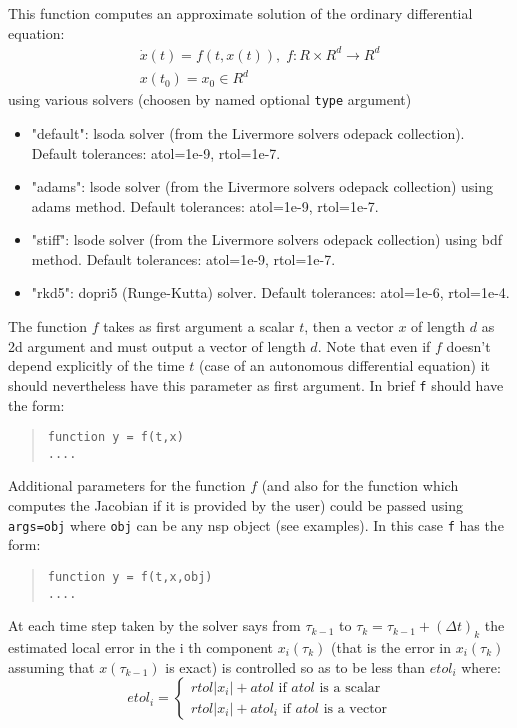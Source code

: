 \begin{mandescription}

This function computes an approximate solution of the ordinary differential equation:
$$
\begin{array}{l}
   \dot{x}(t) = f(t, x(t)), \; f: R \times R^d \rightarrow  R^d \\
   x(t_0) = x_0  \in  R^d
\end{array}
$$
using various solvers (choosen by named optional \verb+type+ argument) 
\begin{itemize}
\item "default": lsoda solver (from the Livermore solvers odepack collection). Default tolerances: atol=1e-9,
  rtol=1e-7.  
\item "adams": lsode solver (from the Livermore solvers odepack collection) using adams method. Default tolerances: atol=1e-9, rtol=1e-7.
\item "stiff": lsode solver (from the Livermore solvers odepack collection) using bdf method. Default tolerances: atol=1e-9, rtol=1e-7.
\item "rkd5": dopri5 (Runge-Kutta) solver. Default tolerances: atol=1e-6, rtol=1e-4.
\end{itemize}


The function $f$ takes as first argument a scalar $t$, then a vector $x$ of length $d$ as 2d argument and 
must output a vector of length $d$. Note that even if $f$ doesn't depend explicitly of the time $t$ (case of 
an autonomous differential equation) it should nevertheless have this parameter as first argument. 
In brief \verb+f+ should have the form:
\begin{quote}
{\tt function y = f(t,x) \\
      ....}
  \end{quote}

Additional parameters for the function $f$ (and also for the function which computes the Jacobian 
if it is provided by the user) could be passed using \verb+args=obj+ where \verb+obj+ can be any nsp 
object (see examples). In this case \verb+f+ has the form:
\begin{quote}
{\tt function y = f(t,x,obj) \\
      ....}
\end{quote}


At each time step taken by the solver says from $\tau_{k-1}$ to  $\tau_k = \tau_{k-1} + (\Delta t)_k$
the estimated local error in the i th component $x_i(\tau_k)$ (that is the error in 
$x_i(\tau_k)$ assuming that $x(\tau_{k-1})$ is exact) is controlled so as to be less 
than $etol_i$ where:
$$
etol_i =
\left\{
\begin{array}{l}
 rtol | x_i | + atol  \mbox{ if } atol \mbox { is a scalar} \\
 rtol | x_i | + atol_i  \mbox{ if } atol \mbox { is a vector}
\end{array}
\right.
$$


\end{mandescription}
